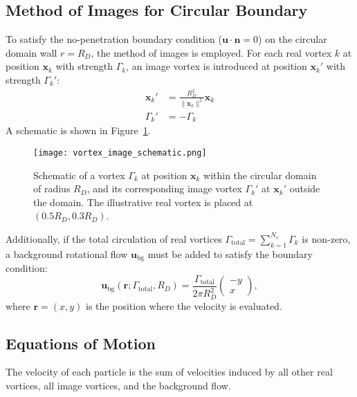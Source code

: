 \documentclass[12pt,letterpaper]{article}
\newcommand{\vel}{\bm{u}}
\newcommand{\pos}{\bm{x}}
\newcommand{\vortstrength}{\Gamma}
\newcommand{\domainradius}{R_D}
\begin{document}
\subsection{Method of Images for Circular Boundary}
To satisfy the no-penetration boundary condition ($\vel \cdot \bm{n} = 0$) on the circular domain wall $r = \domainradius$, the method of images is employed. For each real vortex $k$ at position $\pos_k$ with strength $\vortstrength_k$, an image vortex is introduced at position $\pos_k'$ with strength $\vortstrength_k'$:
\begin{align}
    \pos_k' &= \frac{\domainradius^2}{\|\pos_k\|^2} \pos_k \label{eq:image_pos} \\
    \vortstrength_k' &= -\vortstrength_k \label{eq:image_strength}
\end{align}
A schematic is shown in Figure~\ref{fig:vortex_image_schematic}.

\begin{figure}[H]
    \centering
    \texttt{[image: vortex\_image\_schematic.png]} 
    \caption{Schematic of a vortex $\vortstrength_k$ at position $\pos_k$ within the circular domain of radius $\domainradius$, and its corresponding image vortex $\vortstrength_k'$ at $\pos_k'$ outside the domain. The illustrative real vortex is placed at $(0.5 \domainradius, 0.3 \domainradius)$.}
    \label{fig:vortex_image_schematic}
\end{figure}

Additionally, if the total circulation of real vortices $\vortstrength_{\text{total}} = \sum_{k=1}^{N_v} \vortstrength_k$ is non-zero, a background rotational flow $\vel_{\text{bg}}$ must be added to satisfy the boundary condition:
\begin{equation}
    \vel_{\text{bg}}(\bm{r}; \vortstrength_{\text{total}}, \domainradius) = \frac{\vortstrength_{\text{total}}}{2\pi \domainradius^2} \begin{pmatrix} -y \\ x \end{pmatrix},
    \label{eq:background_flow}
\end{equation}
where $\bm{r}=(x,y)$ is the position where the velocity is evaluated.

\subsection{Equations of Motion}
The velocity of each particle is the sum of velocities induced by all other real vortices, all image vortices, and the background flow.
\end{document}
